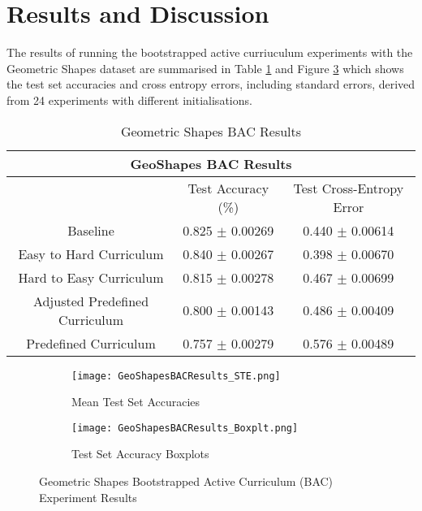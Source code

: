 \section{Results and Discussion}\label{sec:BAC_Results}
The results of running the bootstrapped active curriuculum experiments with the Geometric Shapes dataset are summarised in Table \ref{tab:GeoShapes BACResults} and Figure \ref{fig:GeoShapesBACResults} which shows the test set accuracies and cross entropy errors, including standard errors, derived from 24 experiments with different initialisations.
\begin{table}[h]
\caption{Geometric Shapes BAC Results} \label{tab:GeoShapes BACResults}
\begin{tabular}{|c||c|c|}
\hline
\multicolumn{3}{|c|}{GeoShapes BAC Results} \\
\hline
 & Test Accuracy (\%) & Test Cross-Entropy Error \\
\hline
Baseline&  0.825 $\pm$ 0.00269 & 0.440 $\pm$ 0.00614 \\
\hline
Easy to Hard Curriculum & 0.840 $\pm$ 0.00267 & 0.398 $\pm$ 0.00670 \\
\hline
Hard to Easy Curriculum &  0.815 $\pm$ 0.00278 & 0.467 $\pm$ 0.00699 \\
\hline
Adjusted Predefined Curriculum & 0.800 $\pm$ 0.00143 & 0.486 $\pm$ 0.00409 \\
\hline
Predefined Curriculum & 0.757 $\pm$ 0.00279 & 0.576 $\pm$ 0.00489 \\
\hline
\end{tabular}
\end{table}
\begin{figure}[h]
\hspace*{-3cm}    
\centering
\begin{subfigure}{0.7\textwidth}
  \centering
  \texttt{[image: GeoShapesBACResults\_STE.png]}
  \caption{ Mean Test Set Accuracies}
  \label{fig:EasyGeoSamples}
\end{subfigure}%
\begin{subfigure}{0.7\textwidth}
\hspace*{-1cm}   
  \centering
  \texttt{[image: GeoShapesBACResults\_Boxplt.png]}
  \caption{Test Set Accuracy Boxplots}
  \label{fig:HardGeoSamples}
\end{subfigure}
\caption{Geometric Shapes Bootstrapped Active Curriculum (BAC) Experiment Results}
\label{fig:GeoShapesBACResults}
\end{figure}

